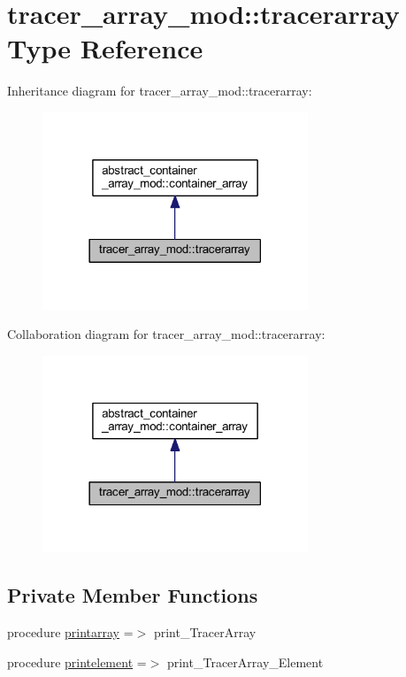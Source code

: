 \hypertarget{structtracer__array__mod_1_1tracerarray}{}\section{tracer\+\_\+array\+\_\+mod\+:\+:tracerarray Type Reference}
\label{structtracer__array__mod_1_1tracerarray}


Inheritance diagram for tracer\+\_\+array\+\_\+mod\+:\+:tracerarray\+:\nopagebreak
\begin{figure}[H]
\begin{center}
\leavevmode
\includegraphics[width=225pt]{structtracer__array__mod_1_1tracerarray__inherit__graph}
\end{center}
\end{figure}


Collaboration diagram for tracer\+\_\+array\+\_\+mod\+:\+:tracerarray\+:\nopagebreak
\begin{figure}[H]
\begin{center}
\leavevmode
\includegraphics[width=225pt]{structtracer__array__mod_1_1tracerarray__coll__graph}
\end{center}
\end{figure}
\subsection*{Private Member Functions}
\begin{DoxyCompactItemize}
\item 
procedure \hyperlink{structtracer__array__mod_1_1tracerarray_a135a59d74ec030814a19278694d25d0a}{printarray} =$>$ print\+\_\+\+Tracer\+Array
\item 
procedure \hyperlink{structtracer__array__mod_1_1tracerarray_a253185a06f76355710fcdd52d9a525f6}{printelement} =$>$ print\+\_\+\+Tracer\+Array\+\_\+\+Element
\end{DoxyCompactItemize}


